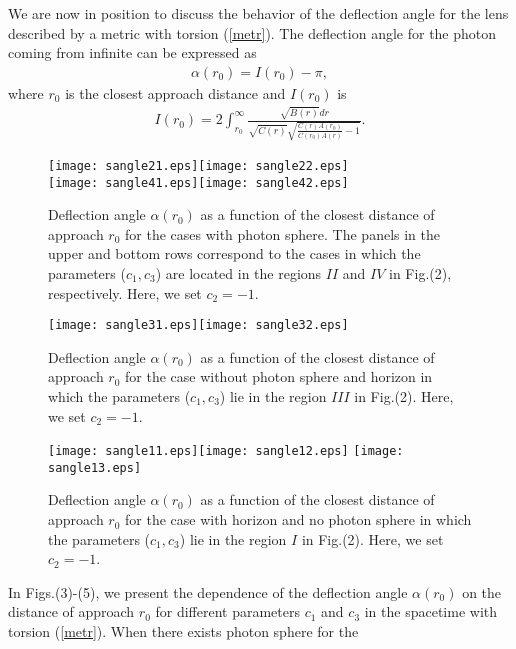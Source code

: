 \documentclass[aps,showpacs,preprintnumbers,amsmath,amssymb]{revtex4}
\begin{document}
We are now in position to discuss the
behavior of the deflection angle for the lens described by a metric with torsion (\ref{metr}). The deflection angle for the photon coming from infinite can be expressed as
\begin{eqnarray}
\alpha(r_0)=I(r_0)-\pi,
\end{eqnarray}
where $r_0$ is the closest approach distance and $I(r_0)$ is
\cite{Ein1}
\begin{eqnarray}
I(r_0)=2\int^{\infty}_{r_0}\frac{\sqrt{B(r)}dr}{\sqrt{C(r)}
\sqrt{\frac{C(r)A(r_0)}{C(r_0)A(r)}-1}}.\label{int1}
\end{eqnarray}
\begin{figure}[ht]\label{pas22}
\begin{center}
\texttt{[image: sangle21.eps]}\texttt{[image: sangle22.eps]}\\
\texttt{[image: sangle41.eps]}\texttt{[image: sangle42.eps]}
\caption{Deflection angle $\alpha(r_0)$ as a function of the closest
distance of approach $r_0$ for the cases with photon sphere. The panels in the upper and bottom rows correspond to the cases in which the parameters ($c_1, c_3$) are located in the regions $II$ and $IV$ in Fig.(2), respectively. Here, we set $c_2=-1$.}
\end{center}
\end{figure}
\begin{figure}[ht]\label{pas3}
\begin{center}
\texttt{[image: sangle31.eps]}\texttt{[image: sangle32.eps]}
\caption{Deflection angle $\alpha(r_0)$ as a function of the closest
distance of approach $r_0$ for the case without photon sphere and horizon in which the parameters ($c_1, c_3$) lie in the region $III$ in Fig.(2). Here, we set $c_2=-1$.}
\end{center}
\end{figure}
\begin{figure}[ht]\label{pas4}
\begin{center}
\texttt{[image: sangle11.eps]}\texttt{[image: sangle12.eps]}
\texttt{[image: sangle13.eps]}
\caption{Deflection angle $\alpha(r_0)$ as a function of the closest
distance of approach $r_0$ for the case with horizon and no photon sphere in which the parameters ($c_1, c_3$) lie in the region $I$ in Fig.(2). Here, we set $c_2=-1$.}
\end{center}
\end{figure}
In Figs.(3)-(5), we present the dependence of the deflection angle $\alpha(r_0)$ on the distance of approach $r_0$ for different parameters $c_1$ and $c_3$ in the spacetime with torsion (\ref{metr}). When there exists photon sphere for the
\end{document}
